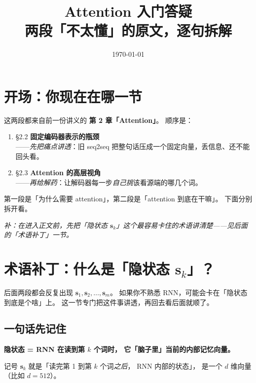 \documentclass[11pt,a4paper]{ctexart}
\title{Attention 入门答疑\\\large 两段「不太懂」的原文，逐句拆解}
\author{}
\date{\today}
\newcommand{\vect}[1]{\boldsymbol{#1}}
\begin{document}
\maketitle
\tableofcontents
\newpage

\section{开场：你现在在哪一节}

这两段都来自前一份讲义的 \textbf{第 2 章「Attention」}。
顺序是：

\begin{enumerate}
  \item §2.2 \textbf{固定编码器表示的瓶颈}\\
        ——\emph{先把痛点讲透}：旧 seq2seq 把整句话压成一个固定向量，丢信息、还不能回头看。
  \item §2.3 \textbf{Attention 的高层视角}\\
        ——\emph{再给解药}：让解码器每一步\emph{自己挑}该看源端的哪几个词。
\end{enumerate}

第一段是「为什么需要 attention」，第二段是「attention 到底在干嘛」。
下面分别拆开看。

\medskip
\noindent\textit{补：在进入正文前，先把「隐状态 $\vect{s}_k$」这个最容易卡住的术语讲清楚——见后面的「术语补丁」一节。}

\section{术语补丁：什么是「隐状态 $\vect{s}_k$」？}

后面两段都会反复出现 $\vect{s}_1, \vect{s}_2, \dots, \vect{s}_m$。
如果你不熟悉 RNN，可能会卡在「隐状态到底是个啥」上。
这一节专门把这件事讲透，再回去看后面就顺了。

\subsection{一句话先记住}

\begin{keypointblock}
\textbf{隐状态 = RNN 在读到第 $k$ 个词时，
它「脑子里」当前的内部记忆向量。}
\end{keypointblock}

记号 $\vect{s}_k$ 就是「读完第 1 到第 $k$ 个词\emph{之后}，
RNN 内部的状态」，
是一个 $d$ 维向量（比如 $d = 512$）。
\end{document}
